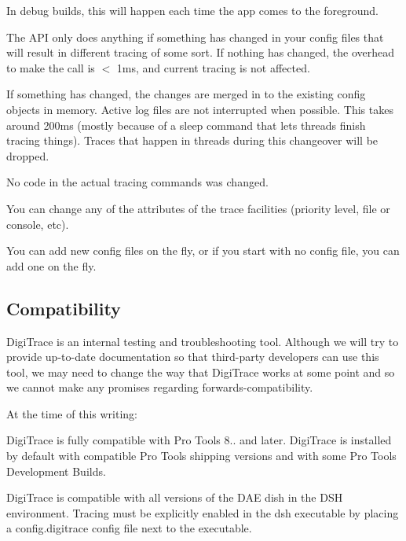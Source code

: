  
\begin{DoxyItemize}
\item In debug builds, this will happen each time the app comes to the foreground.  
\item The A\+PI only does anything if something has changed in your config files that will result in different tracing of some sort. If nothing has changed, the overhead to make the call is $<$ 1ms, and current tracing is not affected.  
\item If something has changed, the changes are merged in to the existing config objects in memory. Active log files are not interrupted when possible. This takes around 200ms (mostly because of a sleep command that lets threads finish tracing things). Traces that happen in threads during this changeover will be dropped.  
\item No code in the actual tracing commands was changed.  
\item You can change any of the attributes of the trace facilities (priority level, file or console, etc).  
\item You can add new config files on the fly, or if you start with no config file, you can add one on the fly.  
\end{DoxyItemize}



 \hypertarget{a00834_digitrace__compatibility}{}\subsection{Compatibility}\label{a00834_digitrace__compatibility}
 Digi\+Trace is an internal testing and troubleshooting tool. Although we will try to provide up-\/to-\/date documentation so that third-\/party developers can use this tool, we may need to change the way that Digi\+Trace works at some point and so we cannot make any promises regarding forwards-\/compatibility.

 At the time of this writing\+:
\begin{DoxyItemize}
\item Digi\+Trace is fully compatible with Pro Tools 8.. and later. Digi\+Trace is installed by default with compatible Pro Tools shipping versions and with some Pro Tools Development Builds.
\item Digi\+Trace is compatible with all versions of the D\+AE dish in the D\+SH environment. Tracing must be explicitly enabled in the dsh executable by placing a config.\+digitrace config file next to the executable.
\end{DoxyItemize}


